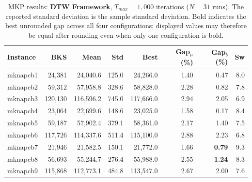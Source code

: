 \begin{table}[htbp]
\centering
\caption{MKP results: \textbf{DTW Framework}, $T_{max} = 1{,}000$ iterations
($N=31$ runs). The reported standard deviation is the sample standard
deviation. Bold indicates the best unrounded gap across all four
configurations; displayed values may therefore be equal after rounding even
when only one configuration is bold.}
\label{tab:mkp_dtw_1k}
\begin{tabular}{lrrrrrrr}
\toprule
\textbf{Instance} & \textbf{BKS} & \textbf{Mean} & \textbf{Std} & \textbf{Best} & \textbf{Gap$_\mu$ (\%)} & \textbf{Gap$_b$ (\%)} & \textbf{Sw} \\
\midrule
mknapcb1 & 24,381 & 24,040.6 & 125.0 & 24,266.0 & 1.40 & 0.47 & 8.0 \\
mknapcb2 & 59,312 & 57,958.8 & 328.6 & 58,828.0 & 2.28 & 0.82 & 7.8 \\
mknapcb3 & 120,130 & 116,596.2 & 745.0 & 117,666.0 & 2.94 & 2.05 & 6.9 \\
mknapcb4 & 23,064 & 22,699.6 & 148.6 & 23,025.0 & 1.58 & 0.17 & 8.4 \\
mknapcb5 & 59,187 & 57,902.4 & 379.1 & 58,361.0 & 2.17 & 1.40 & 7.5 \\
mknapcb6 & 117,726 & 114,337.6 & 511.4 & 115,100.0 & 2.88 & 2.23 & 6.8 \\
mknapcb7 & 21,946 & 21,582.5 & 150.1 & 21,772.0 & 1.66 & \textbf{0.79} & 9.3 \\
mknapcb8 & 56,693 & 55,244.7 & 276.4 & 55,988.0 & 2.55 & \textbf{1.24} & 8.3 \\
mknapcb9 & 115,868 & 112,773.1 & 484.8 & 113,547.0 & 2.67 & 2.00 & 7.6 \\
\bottomrule
\end{tabular}
\end{table}

